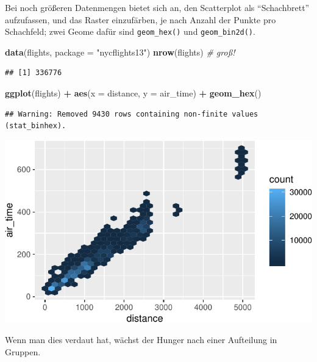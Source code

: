 \documentclass[12pt,ngerman,paper=a4,pagesize,DIV=13]{scrreprt}
\newenvironment{Shaded}{\begin{snugshade}}{\end{snugshade}}
\newcommand{\CommentTok}[1]{\textcolor[rgb]{0.56,0.35,0.01}{\textit{#1}}}
\newcommand{\DataTypeTok}[1]{\textcolor[rgb]{0.13,0.29,0.53}{#1}}
\newcommand{\KeywordTok}[1]{\textcolor[rgb]{0.13,0.29,0.53}{\textbf{#1}}}
\newcommand{\NormalTok}[1]{#1}
\newcommand{\OperatorTok}[1]{\textcolor[rgb]{0.81,0.36,0.00}{\textbf{#1}}}
\newcommand{\StringTok}[1]{\textcolor[rgb]{0.31,0.60,0.02}{#1}}
\begin{document}
Bei noch größeren Datenmengen bietet sich an, den Scatterplot als
\enquote{Schachbrett} aufzufassen, und das Raster einzufärben, je nach
Anzahl der Punkte pro Schachfeld; zwei Geome dafür sind
\texttt{geom\_hex()} und \texttt{geom\_bin2d()}.

\begin{Shaded}
\begin{Highlighting}[]
\KeywordTok{data}\NormalTok{(flights, }\DataTypeTok{package =} \StringTok{"nycflights13"}\NormalTok{)}
\KeywordTok{nrow}\NormalTok{(flights)  }\CommentTok{# groß!}
\end{Highlighting}
\end{Shaded}

\begin{verbatim}
## [1] 336776
\end{verbatim}

\begin{Shaded}
\begin{Highlighting}[]
\KeywordTok{ggplot}\NormalTok{(flights) }\OperatorTok{+}\StringTok{ }\KeywordTok{aes}\NormalTok{(}\DataTypeTok{x =}\NormalTok{ distance, }\DataTypeTok{y =}\NormalTok{ air_time) }\OperatorTok{+}\StringTok{ }\KeywordTok{geom_hex}\NormalTok{()}
\end{Highlighting}
\end{Shaded}

\begin{verbatim}
## Warning: Removed 9430 rows containing non-finite values (stat_binhex).
\end{verbatim}

\includegraphics{DatenerhebungStatistik-Uebung_files/figure-latex/flights_hexbin-1.pdf}

Wenn man dies verdaut hat, wächst der Hunger nach einer Aufteilung in
Gruppen.
\end{document}

